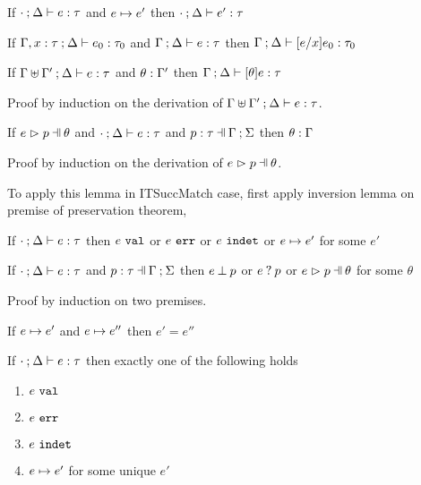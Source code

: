 \begin{thm}[Preservation]
  \label{thrm:preservation}
  If $\cdot \mathbin{;} \Delta \vdash e : \tau$ and $e \mapsto e'$
  then $\cdot \mathbin{;} \Delta \vdash e' : \tau$
\end{thm}

\begin{lem}[Substitution]
  \label{lemma:substitution}
  If $\Gamma, x : \tau \mathbin{;} \Delta \vdash e_0 : \tau_0$ and $\Gamma \mathbin{;} \Delta \vdash e : \tau$
  then $\Gamma \mathbin{;} \Delta \vdash [e/x]e_0 : \tau_0$
\end{lem}

\begin{lem}
  \label{lemma:simult-substitution}
  If $\Gamma \uplus \Gamma' \mathbin{;} \Delta \vdash e : \tau$ and $\theta : \Gamma'$
  then $\Gamma \mathbin{;} \Delta \vdash [\theta]e : \tau$
\end{lem}
Proof by induction on the derivation of $\Gamma \uplus \Gamma' \mathbin{;} \Delta \vdash e : \tau$.

\begin{lem}
  \label{lemma:subs-typing}
  If $\hpatmatch{e}{p}{\theta}$ and $\cdot \mathbin{;} \Delta \vdash e : \tau$ and $\hpattyp{p}{\tau}{\Gamma}{\Sigma}$
  then $\theta : \Gamma$
\end{lem}
Proof by induction on the derivation of $\hpatmatch{e}{p}{\theta}$.

To apply this lemma in ITSuccMatch case, first apply inversion lemma on premise of preservation theorem,

\begin{thm}[Progress]
  \label{thrm:progrs}
  If $\cdot \mathbin{;} \Delta \vdash e : \tau$
  then $e ~\mathtt{val}$ or $e ~\mathtt{err}$ or $e ~\mathtt{indet}$ or $e \mapsto e'$ for some $e'$
\end{thm}

\begin{lem}
  \label{lemma:match-progress}
  If $\cdot \mathbin{;} \Delta \vdash e : \tau$ and $\hpattyp{p}{\tau}{\Gamma}{\Sigma}$
  then $e \mathbin{\bot} p$ or $e \mathbin{?} p$ or $\hpatmatch{e}{p}{\theta}$ for some $\theta$
\end{lem}
Proof by induction on two premises.

\begin{thm}
  \label{thrm:step-determinism}
  If $e \mapsto e'$ and $e \mapsto e''$ then $e' = e''$
\end{thm}

\begin{thm}[Determinism]
  \label{thrm:determinism}
  If $\cdot \mathbin{;} \Delta \vdash e : \tau$ then exactly one of the following holds
  \begin{enumerate}
    \item $e ~\mathtt{val}$
    \item $e ~\mathtt{err}$
    \item $e ~\mathtt{indet}$
    \item $e \mapsto e'$ for some unique $e'$
  \end{enumerate}
\end{thm}

